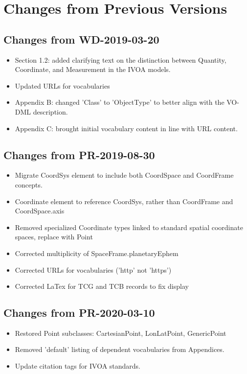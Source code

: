 \pagebreak
\section{Changes from Previous Versions}


\subsection{Changes from WD-2019-03-20}
\begin{itemize} 
  \item Section 1.2: added clarifying text on the distinction between Quantity, Coordinate, and Measurement in the IVOA models.
  \item Updated URLs for vocabularies
  \item Appendix B: changed 'Class' to 'ObjectType' to better align with the VO-DML description.
  \item Appendix C: brought initial vocabulary content in line with URL content.
\end{itemize}
\subsection{Changes from PR-2019-08-30}
\begin{itemize} 
  \item Migrate CoordSys element to include both CoordSpace and CoordFrame concepts.
  \item Coordinate element to reference CoordSys, rather than CoordFrame and CoordSpace.axis
  \item Removed specialized Coordinate types linked to standard spatial coordinate spaces, replace with Point
  \item Corrected multiplicity of SpaceFrame.planetaryEphem
  \item Corrected URLs for vocabularies ('http' not 'https')
  \item Corrected LaTex for TCG and TCB records to fix display 
\end{itemize}
\subsection{Changes from PR-2020-03-10}
\begin{itemize} 
  \item Restored Point subclasses: CartesianPoint, LonLatPoint, GenericPoint
  \item Removed 'default' listing of dependent vocabularies from Appendices.
  \item Update citation tags for IVOA standards.
\end{itemize}
